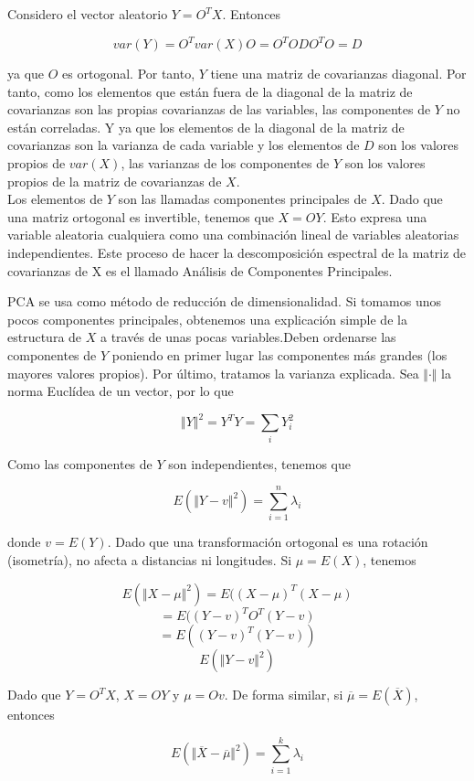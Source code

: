 	Considero el vector aleatorio $Y = O^T X$. Entonces
	
	$$var(Y) = O^T var(X) O = O^T ODO^T O = D$$
	
	ya que $O$ es ortogonal. Por tanto, $Y$ tiene una matriz de covarianzas diagonal. Por tanto, como los elementos que están fuera de la diagonal de la matriz de covarianzas son las propias covarianzas de las variables, las componentes de $Y$ no están correladas. Y ya que los elementos de la diagonal de la matriz de covarianzas son la varianza de cada variable y los elementos de $D$ son los valores propios de $var(X)$, las varianzas de los componentes de $Y$ son los valores propios de la matriz de covarianzas de $X$. \\
	
	Los elementos de $Y$ son las llamadas componentes principales de $X$. Dado que una matriz ortogonal es invertible, tenemos que $X = OY$. Esto expresa una variable aleatoria cualquiera como una combinación lineal de variables aleatorias independientes. Este proceso de  hacer la descomposición espectral de la matriz de covarianzas de X es el llamado Análisis de Componentes Principales.
	
	PCA se usa como método de reducción de dimensionalidad. Si tomamos unos pocos componentes principales, obtenemos una explicación simple de la estructura de $X$ a través de unas pocas variables.Deben ordenarse las componentes de $Y$ poniendo en primer lugar las componentes más grandes (los mayores valores propios). Por último, tratamos la varianza explicada. Sea $\Vert · \Vert$ la norma Euclídea de un vector, por lo que
	
	$$ \Vert Y \Vert^2 = Y^T Y = \sum_{i} Y_i^2$$
	
	Como las componentes de $Y$ son independientes, tenemos que 
	
	$$E(\Vert Y - v \Vert^2) = \sum_{i=1}^{n} \lambda_i$$
	
	donde $v = E(Y)$. Dado que una transformación ortogonal es una rotación (isometría), no afecta a distancias ni longitudes. Si $\mu = E(X)$, tenemos
	
	$$E(\Vert X -\mu \Vert^2) = E((X-\mu)^T (X-\mu)$$
	$$ = E((Y-v)^T O^T (Y-v)$$
	$$ = E((Y-v)^T (Y-v)) $$
	$$E(\Vert Y-v \Vert^2)$$
	
	Dado que $Y = O^TX$, $X = OY$ y $\mu = O v$. De forma similar, si $\overline{\mu} = E(\overline{X})$, entonces
	
	$$E(\Vert \overline{X}- \overline{\mu} \Vert^2) = \sum_{i=1}^{k} \lambda_i$$
	
